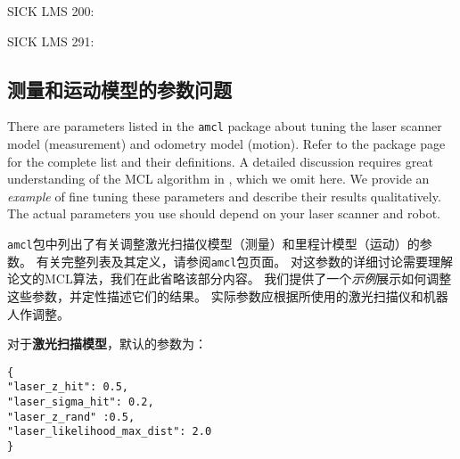 \noindent SICK LMS 200:

\noindent SICK LMS 291:


\subsection[Parameters for measurement and motion models]{测量和运动模型的参数问题}
There are parameters listed in the \texttt{amcl} package about tuning the laser scanner model (measurement)  and odometry model (motion). Refer to the package page for the complete list and their definitions. A detailed discussion requires great understanding of the MCL algorithm in \cite{thrun2005probabilistic}, which we omit here. We provide an \emph{example} of fine tuning these parameters and describe their results qualitatively. The actual parameters you use should depend on your laser scanner and robot.

\texttt{amcl}包中列出了有关调整激光扫描仪模型（测量）和里程计模型（运动）的参数。
有关完整列表及其定义，请参阅\texttt{amcl}包页面。
对这参数的详细讨论需要理解论文\cite{thrun2005probabilistic}的MCL算法，我们在此省略该部分内容。
我们提供了一个\emph{示例}展示如何调整这些参数，并定性描述它们的结果。
实际参数应根据所使用的激光扫描仪和机器人作调整。

对于\textbf{激光扫描模型}，默认的参数为：

\lstset{language=bash}
\begin{lstlisting}
{
"laser_z_hit": 0.5,
"laser_sigma_hit": 0.2,
"laser_z_rand" :0.5,
"laser_likelihood_max_dist": 2.0
}
\end{lstlisting}


